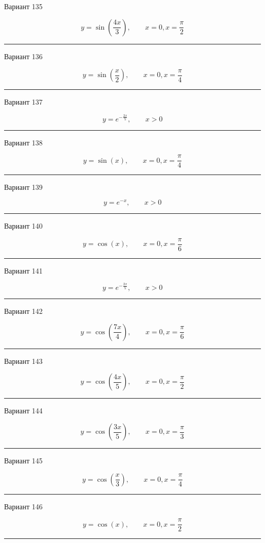 \documentclass[11pt]{report}
\begin{document}
Вариант 135

$$y=\sin{\left(\frac{4 x}{3} \right)}, \qquad x = 0, x = \frac{\pi}{2}$$

\rule{\textwidth}{.2mm}

Вариант 136

$$y=\sin{\left(\frac{x}{2} \right)}, \qquad x = 0, x = \frac{\pi}{4}$$

\rule{\textwidth}{.2mm}

Вариант 137

$$y=e^{- \frac{2 x}{5}}, \qquad x > 0$$

\rule{\textwidth}{.2mm}

Вариант 138

$$y=\sin{\left(x \right)}, \qquad x = 0, x = \frac{\pi}{4}$$

\rule{\textwidth}{.2mm}

Вариант 139

$$y=e^{- x}, \qquad x > 0$$

\rule{\textwidth}{.2mm}

Вариант 140

$$y=\cos{\left(x \right)}, \qquad x = 0, x = \frac{\pi}{6}$$

\rule{\textwidth}{.2mm}

Вариант 141

$$y=e^{- \frac{2 x}{5}}, \qquad x > 0$$

\rule{\textwidth}{.2mm}

Вариант 142

$$y=\cos{\left(\frac{7 x}{4} \right)}, \qquad x = 0, x = \frac{\pi}{6}$$

\rule{\textwidth}{.2mm}

Вариант 143

$$y=\cos{\left(\frac{4 x}{5} \right)}, \qquad x = 0, x = \frac{\pi}{2}$$

\rule{\textwidth}{.2mm}

Вариант 144

$$y=\cos{\left(\frac{3 x}{5} \right)}, \qquad x = 0, x = \frac{\pi}{3}$$

\rule{\textwidth}{.2mm}

Вариант 145

$$y=\cos{\left(\frac{x}{3} \right)}, \qquad x = 0, x = \frac{\pi}{4}$$

\rule{\textwidth}{.2mm}

Вариант 146

$$y=\cos{\left(x \right)}, \qquad x = 0, x = \frac{\pi}{2}$$

\rule{\textwidth}{.2mm}
\end{document}
